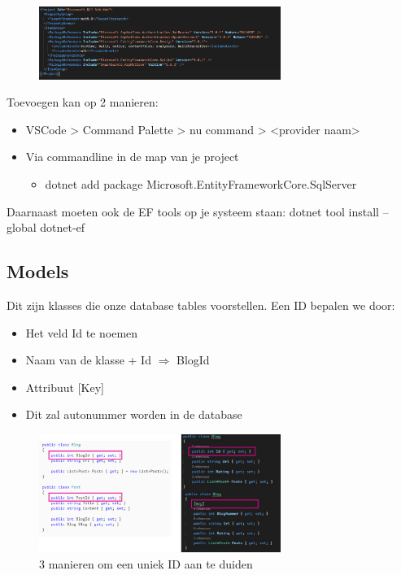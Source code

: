 \documentclass{article}
\begin{document}
\begin{figure}[H]
    \centering
    \includegraphics[width=0.7\textwidth]{efcore-installatie-provider.png}
    \caption{}
\end{figure}

Toevoegen kan op 2 manieren:

\begin{itemize}
    \item VSCode > Command Palette > nu command > <provider naam>
    \item Via commandline in de map van je project
    \begin{itemize}
        \item dotnet add package Microsoft.EntityFrameworkCore.SqlServer
    \end{itemize}
\end{itemize}

Daarnaast moeten ook de EF tools op je systeem staan: dotnet tool install --global dotnet-ef

\subsection{Models}

Dit zijn klasses die onze database tables voorstellen. Een ID bepalen we door:

\begin{itemize}
    \item Het veld Id te noemen
    \item Naam van de klasse + Id $\Rightarrow$ BlogId
    \item Attribuut [Key]
    \item Dit zal autonummer worden in de database
\end{itemize}

\begin{figure}[H]
    \centering
    \includegraphics[width=0.7\textwidth]{efcore-model-id.png}
    \caption{3 manieren om een uniek ID aan te duiden}
\end{figure}
\end{document}
